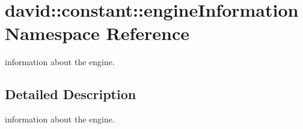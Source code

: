 \hypertarget{namespacedavid_1_1constant_1_1engineInformation}{}\section{david\+:\+:constant\+:\+:engine\+Information Namespace Reference}
\label{namespacedavid_1_1constant_1_1engineInformation}


information about the engine.  




\subsection{Detailed Description}
information about the engine. 